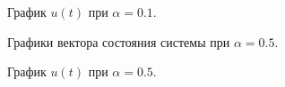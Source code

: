 \begin{figure}[!h]
	\caption{График $u(t)$ при $\alpha = 0.1$.}
	\label{4_4_u_01}
\end{figure}


\begin{figure}[!h]
	\caption{Графики вектора состояния системы при $\alpha = 0.5$.}
	\label{4_4_x_05}
\end{figure}

\begin{figure}[!h]
	\caption{График $u(t)$ при $\alpha = 0.5$.}
	\label{4_4_u_05}
\end{figure}



